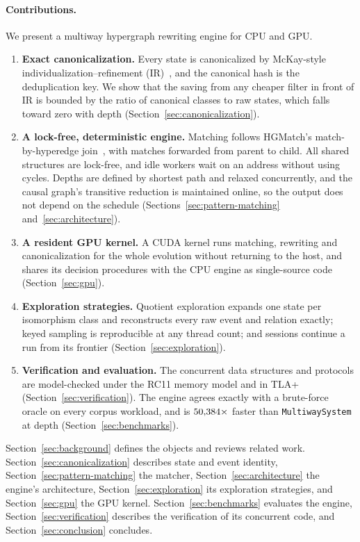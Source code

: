 \paragraph{Contributions.} We present a multiway hypergraph rewriting engine for CPU and GPU.
\begin{enumerate}
    \item \textbf{Exact canonicalization.} Every state is canonicalized by McKay-style
    individualization--refinement (IR)~\cite{mckay2014practical}, and the canonical hash is the
    deduplication key. We show that the saving from any cheaper filter in front of IR is bounded
    by the ratio of canonical classes to raw states, which falls toward zero with depth
    (Section~\ref{sec:canonicalization}).
    \item \textbf{A lock-free, deterministic engine.} Matching follows HGMatch's match-by-hyperedge
    join~\cite{yang2023hgmatch}, with matches forwarded from parent to child. All shared structures
    are lock-free, and idle workers wait on an address without using cycles. Depths are defined
    by shortest path and relaxed concurrently, and the causal graph's transitive reduction is
    maintained online, so the output does not depend on the schedule
    (Sections~\ref{sec:pattern-matching} and~\ref{sec:architecture}).
    \item \textbf{A resident GPU kernel.} A CUDA kernel runs matching, rewriting and
    canonicalization for the whole evolution without returning to the host, and shares its
    decision procedures with the CPU engine as single-source code (Section~\ref{sec:gpu}).
    \item \textbf{Exploration strategies.} Quotient exploration expands one state per isomorphism
    class and reconstructs every raw event and relation exactly; keyed sampling is reproducible at
    any thread count; and sessions continue a run from its frontier
    (Section~\ref{sec:exploration}).
    \item \textbf{Verification and evaluation.} The concurrent data structures and protocols are
    model-checked under the RC11 memory model and in TLA+ (Section~\ref{sec:verification}). The
    engine agrees exactly with a brute-force oracle on every corpus workload, and is
    $50{,}384\times$ faster than \texttt{MultiwaySystem} at depth
    \SpeedupHighDepth{} (Section~\ref{sec:benchmarks}).
\end{enumerate}

Section~\ref{sec:background} defines the objects and reviews related work.
Section~\ref{sec:canonicalization} describes state and event identity,
Section~\ref{sec:pattern-matching} the matcher, Section~\ref{sec:architecture} the engine's
architecture, Section~\ref{sec:exploration} its exploration strategies, and Section~\ref{sec:gpu}
the GPU kernel. Section~\ref{sec:benchmarks} evaluates the engine, Section~\ref{sec:verification}
describes the verification of its concurrent code, and Section~\ref{sec:conclusion} concludes.

